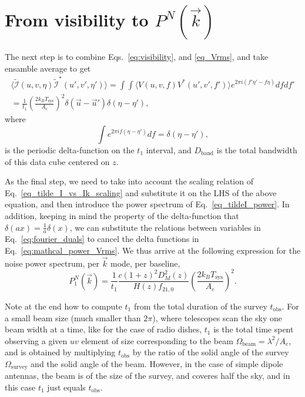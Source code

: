 \documentclass[12pt]{paper}
\newcommand{\beq}{\begin{equation}}
\newcommand{\eeq}{\end{equation}}
\newcommand{\bga}{\begin{gathered}}
\newcommand{\ega}{\end{gathered}}
\begin{document}
\section{From visibility to $P^N(\vec k)$}

The next step is to combine Eqs.~\ref{eq:visibility}, and \ref{eq_Vrms}, and take ensamble average to get
\beq
\bga
\langle\widetilde{\mathcal{I}}(u,v,\eta) \widetilde{\mathcal{I}}^*(u',v',\eta')\rangle =  \int\int\langle V(u,v,f)V^*(u',v',f')\rangle e^{2\pi i(f'\eta'-f\eta)}dfdf'\\
= \frac{1}{t_1}\left(\frac{2k_BT_\text{sys}}{A_e}\right)^2 \delta(\vec{u}-\vec{u}')\delta(\eta-\eta'),
\ega
\label{eq:mathcal_power_Vrms}
\eeq 
where 
\beq
\int e^{2\pi i f(\eta-\eta')}df =\delta(\eta-\eta'),
\eeq
is the periodic delta-function on the $t_1$ interval, and $D_\text{band}$ is the total bandwidth of this data cube centered on $z$.  

As the final step, we need to take into account the scaling relation of Eq.~\ref{eq_tilde_I_vs_Ik_scaling} and substitute it on the LHS of the above equation, and then introduce the power spectrum of Eq.~\ref{eq_tildeI_power}. In addition, keeping in mind the property of the delta-function that $\delta(ax)=\frac{1}{a}\delta(x)$, we can substitute the relations between variables in Eq.~\ref{eq:fourier_duals} to cancel the delta functions in Eq.~\ref{eq:mathcal_power_Vrms}. We thus arrive at the following expression for the noise power spectrum, per $\vec k$ mode, per baseline,
\beq
P_1^N(\vec k) = \frac{1}{t_1}\frac{c(1+z)^2D_M^2(z)}{H(z)f_{21,0}}\left(\frac{2k_BT_\text{sys}}{A_e}\right)^2 .
\label{eq:Pnoise_1mode}
\eeq

Note at the end how to compute $t_1$ from the total duration of the survey  $t_\text{obs}$. For a small beam size (much smaller than $2\pi$), where telescopes scan the sky one beam width at a time, like for the case of radio dishes, $t_1$ is the total time spent observing a given $uv$ element of size corresponding to the beam $\Omega_\text{beam}=\lambda^2/A_e$, and is obtained by multiplying  $t_\text{obs}$ by the ratio of the solid angle of the survey $\Omega_\text{survey}$ and the solid angle of the beam. However, in the case of simple dipole antennas, the beam is of the size of the survey, and coveres half the sky, and in this case $t_1$ just equals $t_\text{obs}$.
\end{document}
